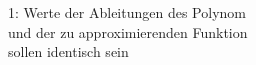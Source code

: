 \documentclass[preview]{standalone}
\begin{document}
\begin{center}
1: Werte der Ableitungen des Polynom\\und der zu approximierenden Funktion\\sollen identisch sein
\end{center}
\end{document}
